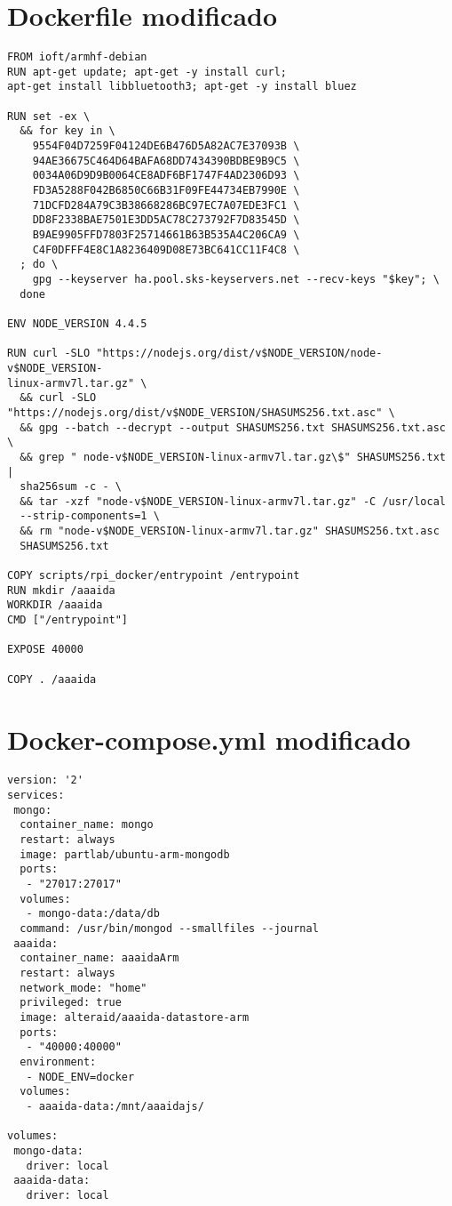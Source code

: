 \section{Dockerfile modificado}
\begin{verbatim}
FROM ioft/armhf-debian
RUN apt-get update; apt-get -y install curl; 
apt-get install libbluetooth3; apt-get -y install bluez

RUN set -ex \
  && for key in \
    9554F04D7259F04124DE6B476D5A82AC7E37093B \
    94AE36675C464D64BAFA68DD7434390BDBE9B9C5 \
    0034A06D9D9B0064CE8ADF6BF1747F4AD2306D93 \
    FD3A5288F042B6850C66B31F09FE44734EB7990E \
    71DCFD284A79C3B38668286BC97EC7A07EDE3FC1 \
    DD8F2338BAE7501E3DD5AC78C273792F7D83545D \
    B9AE9905FFD7803F25714661B63B535A4C206CA9 \
    C4F0DFFF4E8C1A8236409D08E73BC641CC11F4C8 \
  ; do \
    gpg --keyserver ha.pool.sks-keyservers.net --recv-keys "$key"; \
  done

ENV NODE_VERSION 4.4.5

RUN curl -SLO "https://nodejs.org/dist/v$NODE_VERSION/node-v$NODE_VERSION-
linux-armv7l.tar.gz" \
  && curl -SLO "https://nodejs.org/dist/v$NODE_VERSION/SHASUMS256.txt.asc" \
  && gpg --batch --decrypt --output SHASUMS256.txt SHASUMS256.txt.asc \
  && grep " node-v$NODE_VERSION-linux-armv7l.tar.gz\$" SHASUMS256.txt | 
  sha256sum -c - \
  && tar -xzf "node-v$NODE_VERSION-linux-armv7l.tar.gz" -C /usr/local 
  --strip-components=1 \
  && rm "node-v$NODE_VERSION-linux-armv7l.tar.gz" SHASUMS256.txt.asc 
  SHASUMS256.txt

COPY scripts/rpi_docker/entrypoint /entrypoint
RUN mkdir /aaaida
WORKDIR /aaaida
CMD ["/entrypoint"]

EXPOSE 40000

COPY . /aaaida
\end{verbatim}

\section{Docker-compose.yml modificado}
\begin{verbatim}
version: '2'
services:
 mongo:
  container_name: mongo
  restart: always
  image: partlab/ubuntu-arm-mongodb
  ports:
   - "27017:27017"
  volumes:
   - mongo-data:/data/db
  command: /usr/bin/mongod --smallfiles --journal
 aaaida:
  container_name: aaaidaArm
  restart: always
  network_mode: "home"
  privileged: true
  image: alteraid/aaaida-datastore-arm
  ports:
   - "40000:40000"
  environment:
   - NODE_ENV=docker
  volumes:
   - aaaida-data:/mnt/aaaidajs/

volumes:
 mongo-data:
   driver: local
 aaaida-data:
   driver: local  
\end{verbatim}